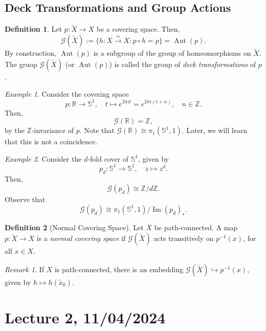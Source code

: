 \documentclass[a4paper]{report}
\theoremstyle{definition}
\newtheorem{definition}{Definition}
\theoremstyle{remark}
\newtheorem{remark}{Remark}
\theoremstyle{proposition}
\theoremstyle{conjecture}
\theoremstyle{lemma}
\theoremstyle{corollary}
\theoremstyle{exercise}
\newtheorem{example}{Example}
\newcommand{\mcal}{\mathcal}
\newcommand{\on}{\operatorname}
\begin{document}
\subsection{Deck Transformations and Group Actions}

\begin{definition}
    Let $p : \widetilde{X} \to X$ be a covering space. Then, 
    $$\mcal{G}(\widetilde{X}) := \lbrace h : X \stackrel{\simeq}{\to} X : p \circ h = p\rbrace = \on{Aut}(p).$$
    By construction, $\on{Aut}(p)$ is a subgroup of the group of homeomorphisms on 
    $\widetilde{X}$. The gruop $\mcal{G}(\widetilde{X})$ (or $\on{Aut}(p)$) is called the
    group of \emph{deck transformations} of $p$.
\end{definition}

\begin{example}
   Consider the covering space 
   $$p : \mathbb{R} \to \mathbb{S}^1, \quad t \longmapsto e^{2\pi it} = e^{2\pi i(t+n)},\quad n \in \mathbb{Z}.$$
   Then, $$\mcal{G}(\mathbb{R}) = \mathbb{Z},$$
   by the $\mathbb{Z}$-invariance of $p$. 
   Note that $\mcal{G}(\mathbb{R}) \cong \pi_1(\mathbb{S}^1,1)$. Later, we will learn that this 
   is not a coincidence. 
\end{example}

\begin{example}
    Consider the $d$-fold cover of $\mathbb{S}^1$, given by 
    $$p_d : \mathbb{S}^1 \longrightarrow \mathbb{S}^1,\quad z\longmapsto z^d.$$
    Then, $$\mcal{G}(p_d) \cong \mathbb{Z}/d\mathbb{Z}.$$
    Observe that 
    $$\mcal{G}(p_d) \cong \pi_1(\mathbb{S}^1,1) / \on{Im}(p_d)_\ast.$$
\end{example}

\begin{definition}[Normal Covering Space]
    Let $X$ be path-connected. 
    A map $p : \widetilde{X} \to X$ is a \emph{normal covering space} if 
    $\mcal{G}(\widetilde{X})$ acts transitively on $p^{-1}(x)$, for all $x\in X$.
\end{definition}

\begin{remark}
    If $X$ is path-connected, there is an embedding 
    $\mcal{G}(\widetilde{X}) \hookrightarrow p^{-1}(x)$, 
    given by $h \mapsto h(\widetilde{x}_0)$.
\end{remark}

\section{Lecture 2, 11/04/2024}
\end{document}
